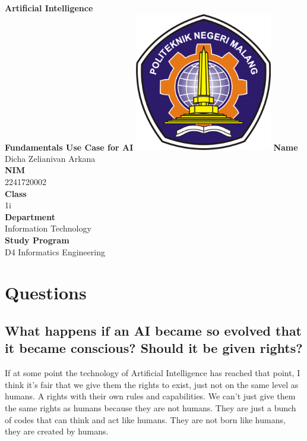 \documentclass[12pt,titlepage]{article}
\newcommand{\vSubject}{Artificial Intelligence}
\newcommand{\vSubtitle}{Fundamentals Use Case for AI}
\newcommand{\vName}{Dicha Zelianivan Arkana}
\newcommand{\vNIM}{2241720002}
\newcommand{\vClass}{1i}
\newcommand{\vDepartment}{Information Technology}
\newcommand{\vStudyProgram}{D4 Informatics Engineering}
\begin{document}
\begin{titlepage}
    \centering
    \vfill
    {\bfseries\LARGE
        \vSubject\\
        \vskip0.25cm
        \vSubtitle
    }
    \vfill
    \includegraphics[width=6cm]{images/polinema-logo.png}
    \vfill
    {
        \textbf{Name}\\
        \vName\\
        \vskip0.5cm
        \textbf{NIM}\\
        \vNIM\\
        \vskip0.5cm
        \textbf{Class}\\
        \vClass\\
        \vskip0.5cm
        \textbf{Department}\\
        \vDepartment\\
        \vskip0.5cm
        \textbf{Study Program}\\
        \vStudyProgram
    }
\end{titlepage}

\tableofcontents
\pagebreak

\section{Questions}
\subsection{What happens if an AI became so evolved that it became conscious? Should it be given rights?}
If at some point the technology of Artificial Intelligence has reached that point, I think it's fair that we give them
the rights to exist, just not on the same level as humans. A rights with their own rules and capabilities.
We can't just give them the same rights as humans because they are not humans. 
They are just a bunch of codes that can think and act like humans.
They are not born like humans, they are created by humans.
\end{document}
